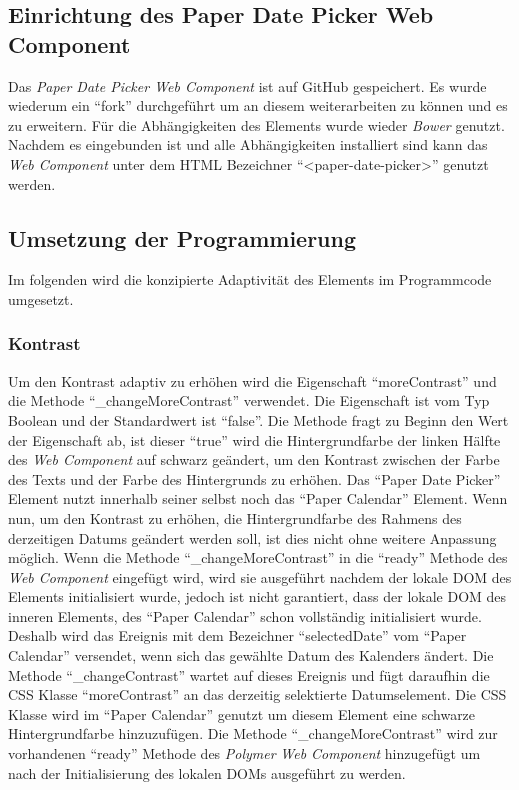 \documentclass[12pt, paper=a4, bibtotoc, toc=listof, headsepline=true]{scrreprt}
\begin{document}
		\subsection{Einrichtung des Paper Date Picker Web Component}
		Das \emph{Paper Date Picker Web Component} ist auf GitHub gespeichert. Es wurde wiederum ein \enquote{fork} durchgeführt um an diesem weiterarbeiten zu können und es zu erweitern. Für die Abhängigkeiten des Elements wurde wieder \emph{Bower} genutzt. Nachdem es eingebunden ist und alle Abhängigkeiten installiert sind kann das \emph{Web Component} unter dem \ac{HTML} Bezeichner \enquote{<paper-date-picker>} genutzt werden.
		\subsection{Umsetzung der Programmierung}
		Im folgenden wird die konzipierte Adaptivität des Elements im Programmcode umgesetzt. 
		\subsubsection{Kontrast}
		Um den Kontrast adaptiv zu erhöhen wird die Eigenschaft \enquote{moreContrast} und die Methode \enquote{\_changeMoreContrast} verwendet. Die Eigenschaft ist vom Typ Boolean und der Standardwert ist \enquote{false}. Die Methode fragt zu Beginn den Wert der Eigenschaft ab, ist dieser \enquote{true} wird die Hintergrundfarbe der linken Hälfte des \emph{Web Component} auf schwarz geändert, um den Kontrast zwischen der Farbe des Texts und der Farbe des Hintergrunds zu erhöhen. Das \enquote{Paper Date Picker} Element nutzt innerhalb seiner selbst noch das \enquote{Paper Calendar} Element. Wenn nun, um den Kontrast zu erhöhen, die Hintergrundfarbe des Rahmens des derzeitigen Datums geändert werden soll, ist dies nicht ohne weitere Anpassung möglich. Wenn die Methode \enquote{\_changeMoreContrast} in die \enquote{ready} Methode des \emph{Web Component} eingefügt wird, wird sie ausgeführt nachdem der lokale \ac{DOM} des Elements initialisiert wurde, jedoch ist nicht garantiert, dass der lokale \ac{DOM} des inneren Elements, des \enquote{Paper Calendar} schon vollständig initialisiert wurde. Deshalb wird das Ereignis mit dem Bezeichner \enquote{selectedDate} vom \enquote{Paper Calendar} versendet, wenn sich das gewählte Datum des Kalenders ändert. Die Methode \enquote{\_changeContrast} wartet auf dieses Ereignis und fügt daraufhin die \ac{CSS} Klasse \enquote{moreContrast} an das derzeitig selektierte Datumselement. Die \ac{CSS} Klasse wird im \enquote{Paper Calendar} genutzt um diesem Element eine schwarze Hintergrundfarbe hinzuzufügen. Die Methode \enquote{\_changeMoreContrast} wird zur vorhandenen \enquote{ready} Methode des \emph{Polymer} \emph{Web Component} hinzugefügt um nach der Initialisierung des lokalen \ac{DOM}s ausgeführt zu werden.
\end{document}
